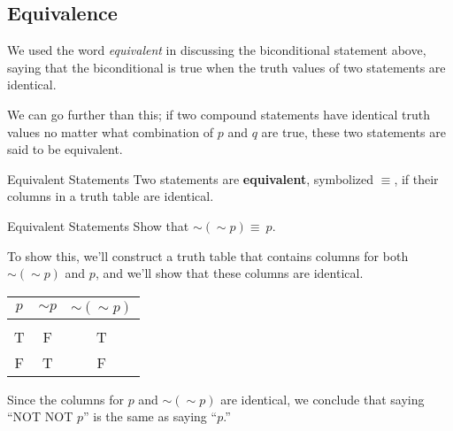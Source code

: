 \subsection{Equivalence}
We used the word \textit{equivalent} in discussing the biconditional statement above, saying that the biconditional is true when the truth values of two statements are identical.

We can go further than this; if two compound statements have identical truth values no matter what combination of $p$ and $q$ are true, these two statements are said to be equivalent.

\begin{proc}{Equivalent Statements}
Two statements are \textbf{equivalent}, symbolized $\equiv$, if their columns in a truth table are identical.
\end{proc}

\begin{example}[https://www.youtube.com/watch?v=B5GmnkcuKHc]{Equivalent Statements}
Show that $\sim (\sim p) \equiv\ p$.

\sol
To show this, we'll construct a truth table that contains columns for both $\sim(\sim p)$ and $p$, and we'll show that these columns are identical.
\begin{center}
\begin{tabular}{|c c c|}
\hline
$p$ & $\sim p$ & $\sim (\sim p)$\\
\hline
& &\\
T & F & T\\
F & T & F\\
\hline
\end{tabular}
\end{center}

Since the columns for $p$ and $\sim (\sim p)$ are identical, we conclude that saying ``NOT NOT $p$'' is the same as saying ``$p$.''
\end{example}

